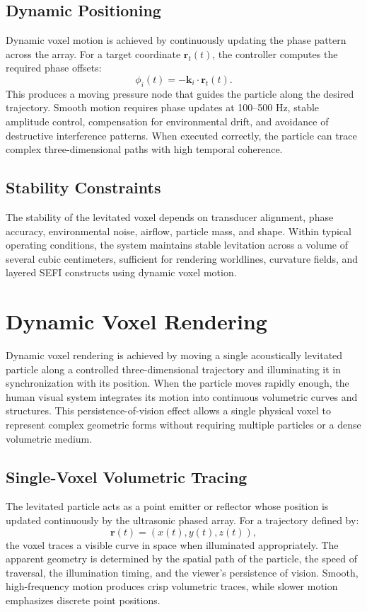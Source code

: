 \documentclass[10pt,twocolumn]{article}
\begin{document}
\subsection{Dynamic Positioning}
Dynamic voxel motion is achieved by continuously updating the phase pattern across the array. For a target coordinate $\mathbf{r}_{t}(t)$, the controller computes the required phase offsets:
\begin{equation}
\phi_{i}(t) = -\mathbf{k}_{i} \cdot \mathbf{r}_{t}(t).
\end{equation}
This produces a moving pressure node that guides the particle along the desired trajectory. Smooth motion requires phase updates at 100--500 Hz, stable amplitude control, compensation for environmental drift, and avoidance of destructive interference patterns. When executed correctly, the particle can trace complex three-dimensional paths with high temporal coherence.

\subsection{Stability Constraints}
The stability of the levitated voxel depends on transducer alignment, phase accuracy, environmental noise, airflow, particle mass, and shape. Within typical operating conditions, the system maintains stable levitation across a volume of several cubic centimeters, sufficient for rendering worldlines, curvature fields, and layered SEFI constructs using dynamic voxel motion.

\section{Dynamic Voxel Rendering}
Dynamic voxel rendering is achieved by moving a single acoustically levitated particle along a controlled three-dimensional trajectory and illuminating it in synchronization with its position. When the particle moves rapidly enough, the human visual system integrates its motion into continuous volumetric curves and structures. This persistence-of-vision effect allows a single physical voxel to represent complex geometric forms without requiring multiple particles or a dense volumetric medium.

\subsection{Single-Voxel Volumetric Tracing}
The levitated particle acts as a point emitter or reflector whose position is updated continuously by the ultrasonic phased array. For a trajectory defined by:
\begin{equation}
\mathbf{r}(t) = (x(t), y(t), z(t)),
\end{equation}
the voxel traces a visible curve in space when illuminated appropriately. The apparent geometry is determined by the spatial path of the particle, the speed of traversal, the illumination timing, and the viewer's persistence of vision. Smooth, high-frequency motion produces crisp volumetric traces, while slower motion emphasizes discrete point positions.
\end{document}

